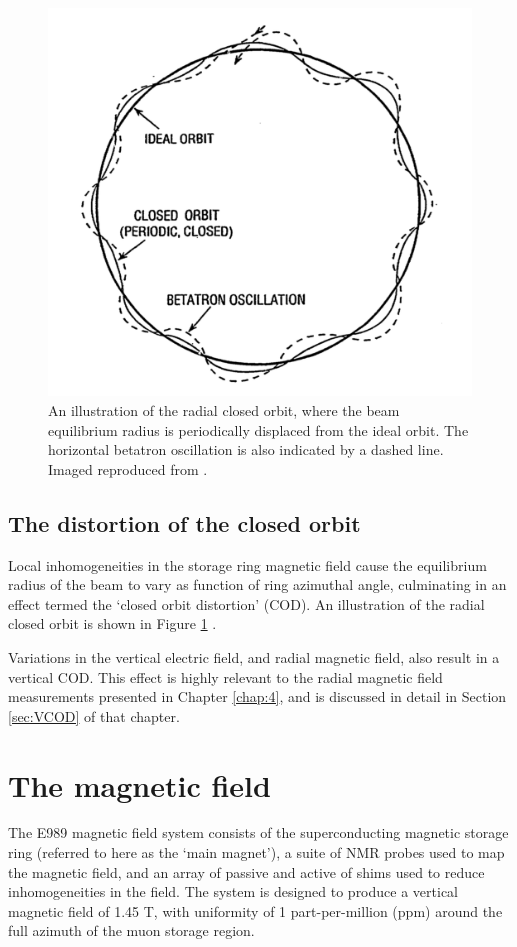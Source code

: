 \begin{figure}[t!]
\centering{}
\includegraphics[trim={0 0 0 0},clip,width=.59\textwidth]{Images/Chapter3/COD_cartoon.png}
\caption{An illustration of the radial closed orbit, where the beam equilibrium radius is periodically displaced from the ideal orbit. The horizontal betatron oscillation is also indicated by a dashed line. Imaged reproduced from \cite{COD_note}.}
\label{fig:COD}
\end{figure} 

\subsection{The distortion of the closed orbit}\label{subsec:COD}

Local inhomogeneities in the storage ring magnetic field cause the equilibrium radius of the beam to vary as function of ring azimuthal angle, culminating in an effect termed the `closed orbit distortion' (COD). An illustration of the radial closed orbit is shown in Figure \ref{fig:COD} \cite{COD_note}.

Variations in the vertical electric field, and radial magnetic field, also result in a vertical COD. This effect is highly relevant to the radial magnetic field measurements presented in Chapter \ref{chap:4}, and is discussed in detail in Section \ref{sec:VCOD} of that chapter.

\section{The magnetic field}\label{sec:Field}

The E989 magnetic field system consists of the superconducting magnetic storage ring (referred to here as the `main magnet'), a suite of NMR probes used to map the magnetic field, and an array of passive and active of shims used to reduce inhomogeneities in the field. The system is designed to produce a vertical magnetic field of 1.45 T, with uniformity of 1 part-per-million (ppm) around the full azimuth of the muon storage region.

